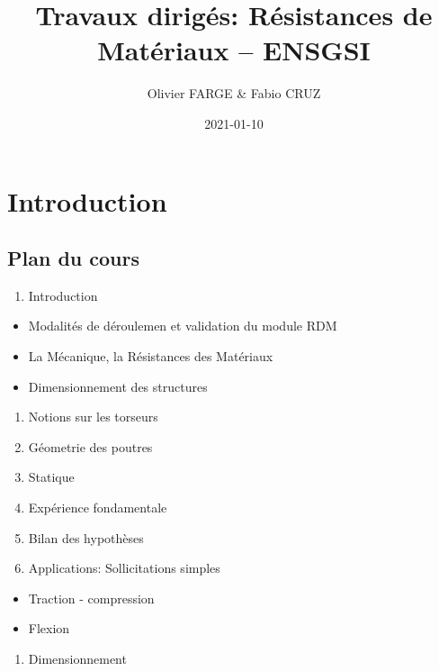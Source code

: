 \documentclass[
]{book}
\title{Travaux dirigés: Résistances de Matériaux -- ENSGSI}
\author{Olivier FARGE \& Fabio CRUZ}
\date{2021-01-10}
\providecommand{\tightlist}{%
  \setlength{\itemsep}{0pt}\setlength{\parskip}{0pt}}
\begin{document}
\maketitle

{
\setcounter{tocdepth}{1}
\tableofcontents
}
\hypertarget{introduction}{%
\chapter{Introduction}\label{introduction}}

\hypertarget{intro}{%
\section{Plan du cours}\label{intro}}

\begin{enumerate}
\def\labelenumi{\arabic{enumi}.}
\tightlist
\item
  Introduction
\end{enumerate}

\begin{itemize}
\tightlist
\item
  Modalités de déroulemen et validation du module RDM
\item
  La Mécanique, la Résistances des Matériaux
\item
  Dimensionnement des structures
\end{itemize}

\begin{enumerate}
\def\labelenumi{\arabic{enumi}.}
\tightlist
\item
  Notions sur les torseurs
\item
  Géometrie des poutres
\item
  Statique
\item
  Expérience fondamentale
\item
  Bilan des hypothèses
\item
  Applications: Sollicitations simples
\end{enumerate}

\begin{itemize}
\tightlist
\item
  Traction - compression
\item
  Flexion
\end{itemize}

\begin{enumerate}
\def\labelenumi{\arabic{enumi}.}
\tightlist
\item
  Dimensionnement
\end{enumerate}
\end{document}
